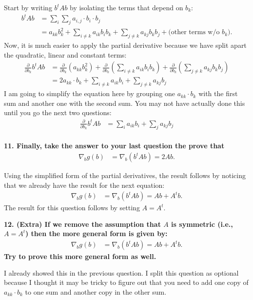 \documentclass[12pt,hidelinks]{article}
\numberwithin{equation}{section}
\begin{document}
Start by writing $b^t A b$ by isolating the terms that depend on $b_k$:
\begin{align}
b^t A b &= \sum_i \sum_j a_{i,j} \cdot b_i \cdot b_j \\
&= a_{kk} b_k^2 + \sum_{i \neq k} a_{ik} b_i b_k + \sum_{j \neq k} a_{kj} b_k b_j +
\text{(other terms w/o $b_k$)}.
\end{align}
Now, it is much easier to apply the partial derivative because we have split
apart the quadratic, linear and constant terms:
\begin{align}
\frac{\partial}{\partial b_k} b^t A b &=
\frac{\partial}{\partial b_k} (a_{kk} b_k^2) +
\frac{\partial}{\partial b_k} (\sum_{i \neq k} a_{ik} b_i b_k) +
\frac{\partial}{\partial b_k} (\sum_{j \neq k} a_{kj} b_k b_j) \\
&= 2 a_{kk} \cdot b_k + \sum_{i \neq k} a_{ik} b_i + \sum_{j \neq k} a_{kj} b_j
\end{align}
I am going to simplify the equation here by grouping one $a_{kk} \cdot b_k$ with
the first sum and another one with the second sum. You may not have actually
done this until you go the next two questions:
\begin{align}
\frac{\partial}{\partial b_k} b^t A b &=
\sum_{i} a_{ik} b_i + \sum_{j} a_{kj} b_j \\
\end{align}

\vspace*{12pt}

\textbf{11. Finally, take the answer to your last question the prove that}
\begin{align}
\nabla_b g (b) &= \nabla_b \left( b^t A b \right) = 2 A b.
\end{align}

\vspace*{12pt}

Using the simplified form of the partial derivatives, the result follows by
noticing that we already have the result for the next equation:
\begin{align}
\nabla_b g (b) &= \nabla_b \left( b^t A b \right) = A b + A^t b.
\end{align}
The result for this question follows by setting $A = A^t$.

\vspace*{12pt}

\textbf{12. (Extra) If we remove the assumption that $A$ is symmetric (i.e., $A = A^t$)
then the more general form is given by:}
\begin{align}
\nabla_b g (b) &= \nabla_b \left( b^t A b \right) = A b + A^t b.
\end{align}
\textbf{Try to prove this more general form as well.}

\vspace*{12pt}

I already showed this in the previous question. I split this question as optional
because I thought it may be tricky to figure out that you need to add one copy of
$a_{kk} \cdot b_k$ to one sum and another copy in the other sum.
\end{document}

